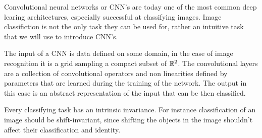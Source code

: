 \documentclass[../3.tex]{subfiles}
\begin{document}
    Convolutional neural networks or CNN's are today one of the most common deep learing architectures, especially successful at classifying images.
    Image classifiction is not the only task they can be used for, rather an intuitive task that we will use to introduce CNN's.

    The input of a CNN is data defined on some domain, in the case of image recognition it is a grid sampling a compact subset of $\mathbb{R}^2$.
    The convolutional layers are a collection of convolutional operators and non linearities defined by parameters that are learned during the training
    of the network. The output in this case is an abstract representation of the input that can be then classified.

    Every classifying task has an intrinsic invariance. For instance classification of an image should be shift-invariant, since shifting the objects in the
    image shouldn't affect their classification and identity.
\end{document}
